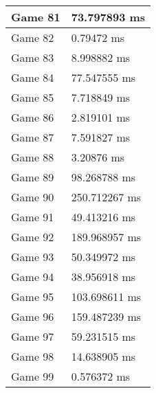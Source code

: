 \begin{tabular}{|l|l|}
	Game 81 & 73.797893 ms \\ \hline
	Game 82 & 0.79472 ms \\ \hline
	Game 83 & 8.998882 ms \\ \hline
	Game 84 & 77.547555 ms \\ \hline
	Game 85 & 7.718849 ms \\ \hline
	Game 86 & 2.819101 ms \\ \hline
	Game 87 & 7.591827 ms \\ \hline
	Game 88 & 3.20876 ms \\ \hline
	Game 89 & 98.268788 ms \\ \hline
	Game 90 & 250.712267 ms \\ \hline
	Game 91 & 49.413216 ms \\ \hline
	Game 92 & 189.968957 ms \\ \hline
	Game 93 & 50.349972 ms \\ \hline
	Game 94 & 38.956918 ms \\ \hline
	Game 95 & 103.698611 ms \\ \hline
	Game 96 & 159.487239 ms \\ \hline
	Game 97 & 59.231515 ms \\ \hline
	Game 98 & 14.638905 ms \\ \hline
	Game 99 & 0.576372 ms \\ \hline
\end{tabular}
